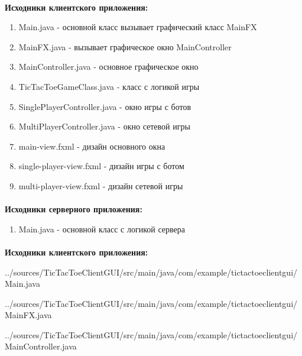\documentclass[12pt, a4paper, simple]{eskdtext}
\begin{document}
    \paragraph{}\textbf{Исходники клиентского приложения:}

    \begin{enumerate}
        \item Main.java - основной класс вызывает графический класс MainFX
        \item MainFX.java - вызывает графическое окно MainController
        \item MainController.java - основное графическое окно
        \item TicTacToeGameClass.java - класс с логикой игры
        \item SinglePlayerController.java - окно игры с ботов
        \item MultiPlayerController.java - окно сетевой игры
        \item main-view.fxml - дизайн основного окна
        \item single-player-view.fxml - дизайн игры с ботом
        \item multi-player-view.fxml - дизайн сетевой игры
    \end{enumerate}

    \paragraph{}\textbf{Исходники серверного приложения:}

    \begin{enumerate}
        \item Main.java - основной класс с логикой сервера
    \end{enumerate}

    \paragraph{}\textbf{Исходники клиентского приложения:}

    
    {../sources/TicTacToeClientGUI/src/main/java/com/example/tictactoeclientgui/Main.java}

    
    {../sources/TicTacToeClientGUI/src/main/java/com/example/tictactoeclientgui/MainFX.java}

    
    {../sources/TicTacToeClientGUI/src/main/java/com/example/tictactoeclientgui/MainController.java}
\end{document}

